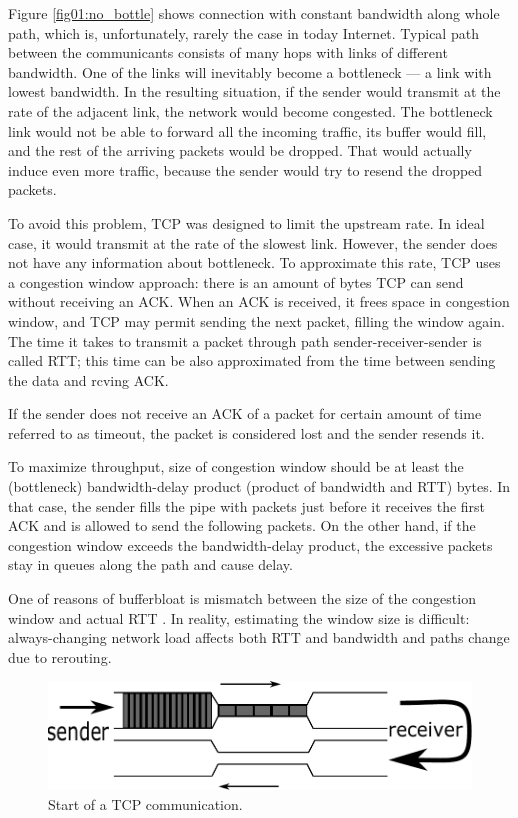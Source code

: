 Figure \ref{fig01:no_bottle} shows connection with constant bandwidth along whole path, which is, unfortunately, rarely the case in today Internet. Typical path between the communicants consists of many hops with links of different bandwidth. One of the links will inevitably become a bottleneck --- a link with lowest bandwidth. In the resulting situation, if the sender would transmit at the rate of the adjacent link, the network would become congested. The bottleneck link would not be able to forward all the incoming traffic, its buffer would fill, and the rest of the arriving packets would be dropped. That would actually induce even more traffic, because the sender would try to resend the dropped packets.

To avoid this problem, TCP was designed to limit the upstream rate. In ideal case, it would transmit at the rate of the slowest link. However, the sender does not have any information about bottleneck. To approximate this rate, TCP uses a congestion window approach: there is an amount of bytes TCP can send without receiving an ACK. When an ACK is received, it frees space in congestion window, and TCP may permit sending the next packet, filling the window again. The time it takes to transmit a packet through path sender-receiver-sender is called RTT; this time can be also approximated from the time between sending the data and rcving ACK.

If the sender does not receive an ACK of a packet for certain amount of time referred to as timeout, the packet is considered lost and the sender resends it.

To maximize throughput, size of congestion window should be at least the (bottleneck) bandwidth-delay product (product of bandwidth and RTT) bytes. In that case, the sender fills the pipe with packets just before it receives the first ACK and is allowed to send the following packets. On the other hand, if the congestion window exceeds the bandwidth-delay product, the excessive packets stay in queues along the path and cause delay. 

One of reasons of bufferbloat is mismatch between the size of the congestion window and actual RTT \cite{CoDel}. In reality, estimating the window size is difficult: always-changing network load affects both RTT and bandwidth and paths change due to rerouting.

\begin{figure}
	\centering
	\includegraphics[width=.8\linewidth]{drawings/tcp_bottleneck_1}
	\caption{Start of a TCP communication.}
	
	\label{fig02:bottle_1}
\end{figure}


